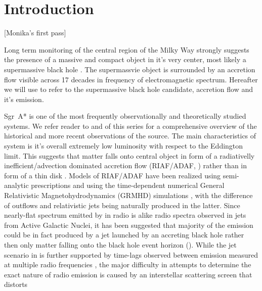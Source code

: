 \section{Introduction}\label{sec:intro}

\color{red}
[Monika's first pass]
\color{black}

Long term monitoring of the central region of the Milky Way strongly suggests the presence of a massive and compact object in it's very center, most likely a supermassive black hole \citep{2019Sci...365..664D,2019A&A...625L..10G}. The supermassvie object is surrounded by an accretion flow visible across 17 decades in frequency of electromagnetic spectrum. Hereafter we will use \sgra to refer to the supermassive black hole candidate, accretion flow and it's emission.

Sgr~A* is one of the most frequently observationally and theoretically studied systems.  We refer reader to  and  of this series for a comprehensive overview of the historical and more recent observations of the source. The main characteristics of \sgra system is it's overall extremely low luminosity with respect to the Eddington limit. This suggests that matter falls onto \sgra central object in form of a radiativelly inefficient/advection dominated accretion flow (RIAF/ADAF, \citealt{1977ApJ...214..840I,1994ApJ...428L..13N, 1995ApJ...444..231N,
  1995ApJ...452..710N, 1996A&AS..120C.287N, 1998ApJ...492..554N,2014ARA&A..52..529Y}) rather than in form of a thin disk \citep{1973A&A....24..337S}. Models of RIAF/ADAF have been realized using semi-analytic prescriptions \citep[e.g.,][]{1995Natur.374..623N,2000ApJ...541..234O, 2009ApJ...697...45B,2011ApJ...735..110B,2018ApJ...863..148P} and using the time-dependent numerical General Relativistic Magnetohydrodynamics (GRMHD) simulations \citep[e.g.,][]{2000ApJ...528..462H, 2003ApJ...589..458D,
  2003ApJ...589..444G, 2007CQGra..24S.235G, 2012ApJS..201....9F,
  2014ApJ...796...22F, 2016ApJS..225...22W, 2017ApJS..231...17A,
  2018JPhCS1031a2008O, 2019A&A...629A..61O, 2019ApJS..243...26P}, with the difference of outflows and
relativistic jets being naturally produced in the latter. Since nearly-flat spectrum emitted by \sgra in radio is alike radio spectra observed in jets from Active Galactic Nuclei, it has been suggested that majority of the \sgra emission could be in fact produced by a jet launched by an accreting black hole rather then only matter falling onto the black hole event horizon (\citealt{2000A&A...362..113F,2004A&A...414..895F, 2005ApJ...635.1203M, 2013A&A...559L...3M}).  While the jet scenario in \sgra is further supported by time-lags observed between emission measured at multiple radio frequencies \citep{2015A&A...576A..41B,2021arXiv210713402B}, the major difficulty in attempts to determine the exact nature of \sgra radio emission is caused by an interstellar scattering screen that distorts
